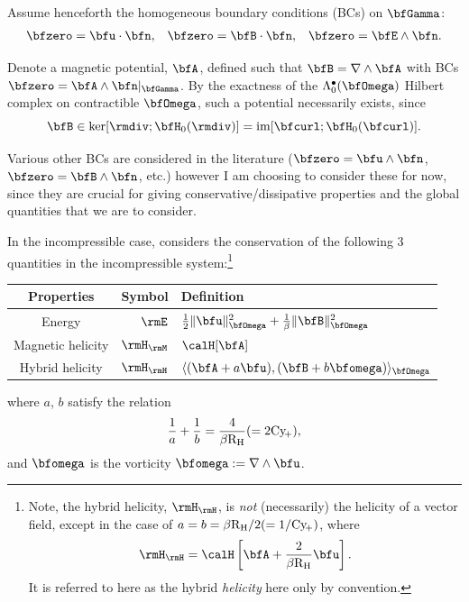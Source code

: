     Assume henceforth the homogeneous boundary conditions (BCs) on $\bfGamma$:
    \begin{align}\label{eqn:canonical boundary conditions}
        \bfzero  =  \bfu\cdot\bfn,   &&
        \bfzero  =  \bfB\cdot\bfn,   &&
        \bfzero  =  \bfE\wedge\bfn.
    \end{align}

    Denote a magnetic potential, $\bfA$, defined such that $\bfB  =  \nabla\wedge\bfA$ with BCs $\bfzero  =  \bfA\wedge\bfn|_{\bfGamma}$. By the exactness of the $\Lambda_{0}^{\bullet}(\bfOmega)$ Hilbert complex on contractible $\bfOmega$, such a potential necessarily exists, since
    \begin{equation}
        \bfB  \in  \ker[\rmdiv; \bfH_{0}(\rmdiv)]  =  \im[\bfcurl; \bfH_{0}(\bfcurl)].
    \end{equation}

    \begin{remark}
        Various other BCs are considered in the literature ($\bfzero = \bfu\wedge\bfn$, $\bfzero = \bfB\wedge\bfn$, etc.) however I am choosing to consider these for now, since they are crucial for giving conservative/dissipative properties and the global quantities that we are to consider.
    \end{remark}

    In the incompressible case, \cite{Laakmann_Hu_Farrell_2022} considers the conservation of the following 3 quantities in the incompressible system:\footnote{Note, the hybrid helicity, $\rmH_{\rmH}$, is \emph{not} (necessarily) the helicity of a vector field, except in the case of $a = b = \beta\mathrm{R}_{\mathrm{H}}/2 (= 1/\mathrm{Cy}\!_{+})$, where
    \begin{equation}
        \rmH_{\rmH} = \calH\left[\bfA + \frac{2}{\beta\rmRH}\bfu\right].
    \end{equation}
    It is referred to here as the hybrid \emph{helicity} here only by convention.}
    \begin{center}\begin{tabular}{ c | r : l }
        Properties  &  Symbol  &  Definition  \\
        \hline\hline
        Energy  &  $\rmE$  &  $\frac{1}{2}\|\bfu\|_{\bfOmega}^{2} + \frac{1}{\beta}\|\bfB\|_{\bfOmega}^{2}$  \\
        \hdashline
        Magnetic helicity \cite{Blackman_2015}  &  $\rmH_{\rmM}$  &  $\calH[\bfA]$  \\
        Hybrid helicity \cite{Subramanian_Brandenburg_2006}  &  $\rmH_{\rmH}$  &  $\langle(\bfA + a\bfu), (\bfB + b\bfomega)\rangle_{\bfOmega}$
    \end{tabular}\end{center}
    where $a$, $b$ satisfy the relation
    \begin{equation}
        \frac{1}{a} + \frac{1}{b}  =  \frac{4}{\beta\mathrm{R}_{\mathrm{H}}}  (=  2\mathrm{Cy}\!_{+}),
    \end{equation}
    and $\bfomega$ is the vorticity $\bfomega  :=  \nabla\wedge\bfu$.
    
